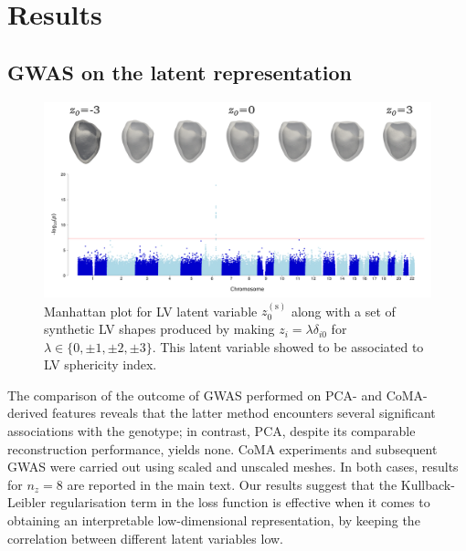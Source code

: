 \section*{Results}
\subsection*{GWAS on the latent representation}
\label{subsec_GWAS}

\begin{figure}[ht!]
\includegraphics[width=\textwidth]{figs/gwas/GWAS_Experiment1_z0_scaled_meshes.png}
\caption{Manhattan plot for LV latent variable $z_0^{(\text{s})}$ along with a set of synthetic LV shapes produced by making $z_i=\lambda \delta_{i0}$ for $\lambda\in\{0, \pm 1, \pm 2, \pm 3\}$. This latent variable showed to be associated to LV sphericity index.}
\label{fig:manhattan_LV_latent}
\end{figure}

The comparison of the outcome of GWAS performed on PCA- and CoMA-derived features reveals that the latter method encounters several significant associations with the genotype; in contrast, PCA, despite its comparable reconstruction performance, yields none. %
CoMA experiments and subsequent GWAS were carried out using scaled and unscaled meshes. In both cases, results for $n_z=8$ are reported in the main text. Our results suggest that the Kullback-Leibler regularisation term in the loss function is effective when it comes to obtaining an interpretable low-dimensional representation, by keeping the correlation between different latent variables low. %

